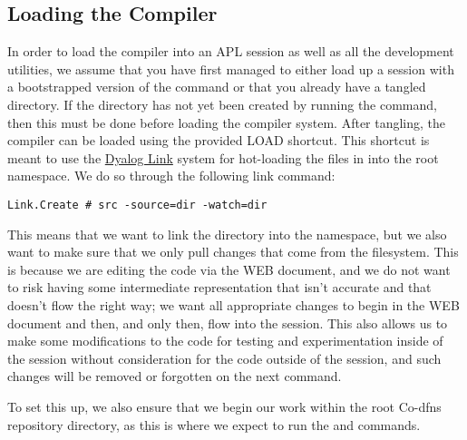 \documentclass{article}%
\begin{document}
\subsection{Loading the Compiler}

In order to load the compiler into an APL session as well as all the
development utilities,
we assume that you have first managed to either load up a session
with a bootstrapped version of the {\Tt{}\nwendquote} command or that you
already have a tangled {\Tt{}\nwendquote} directory.
If the {\Tt{}\nwendquote} directory has not yet been created by running the
{\Tt{}\nwendquote} command,
then this must be done before loading the compiler system.
After tangling,
the compiler can be loaded using the provided {\Tt{}LOAD\nwendquote} shortcut.
This shortcut is meant to use the
\href{https://github.com/Dyalog/link}{Dyalog Link}
system for hot-loading the files in {\Tt{}\nwendquote} into the root namespace.
We do so through the following link command:

\begin{verbatim}
Link.Create # src -source=dir -watch=dir
\end{verbatim}

\noindent
This means that we want to link the {\Tt{}\nwendquote} directory into the {\Tt{}{\#}\nwendquote}
namespace,
but we also want to make sure that we only pull changes that come
from the filesystem.
This is because we are editing the code via the WEB document,
and we do not want to risk having some intermediate representation
that isn't accurate and that doesn't flow the right way;
we want all appropriate changes to begin in the WEB document
and then, and only then, flow into the session.
This also allows us to make some modifications to the code for testing
and experimentation inside of the session without consideration
for the code outside of the session,
and such changes will be removed or forgotten on the next {\Tt{}\nwendquote}
command.

To set this up, we also ensure that we begin our work within the
root Co-dfns repository directory, as this is where we expect to run
the {\Tt{}\nwendquote} and {\Tt{}\nwendquote} commands.
\end{document}
